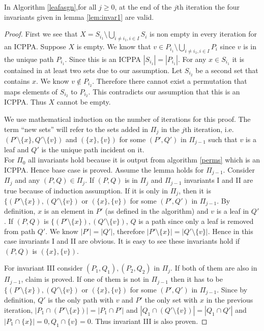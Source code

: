 \documentclass[MS]             %
              {iitmdiss_as}    %
\begin{document}
\begin{lemma}
  \label{lem:invar3}
  In Algorithm \ref{leafasgn},for all $j \geq 0$, at the end of the
  $j$th iteration the four invariants given in lemma \ref{lem:invar1}
  are valid.
\end{lemma}
\begin{proof}
  First we see that $X = S_{i_1} \setminus \bigcup_{i \ne i_1, i \in
    I}S_i$ is non empty in every iteration for an ICPPA. Suppose $X$
  is empty. We know that $v \in P_{i_1} \setminus \bigcup_{i \ne i_1,
    i \in I}P_i$ since $v$ is in the unique path $P_{i_1}$. Since this
  is an ICPPA $|S_{i_1}| = |P_{i_1}|$. For any $x \in S_{i_1}$ it is
  contained in at least two sets due to our assumption. Let $S_{i_2}$
  be a second set that contains $x$. We know $v \notin
  P_{i_2}$. Therefore there cannot exist a permutation that maps
  elements of $S_{i_2}$ to $P_{i_2}$. This contradicts our assumption
  that this is an ICPPA. Thus $X$ cannot be empty.


  We use mathematical induction on the number of iterations for this
  proof. The term ``new sets'' will refer to the sets added in $\Pi_j$
  in the $j$th iteration, i.e. $(P' \setminus \{x\},Q' \setminus
  \{v\})$ and $(\{x\},\{v\})$ for some $(P',Q')$ in $\Pi_{j-1}$ such
  that $v$ is a leaf and $Q'$ is the unique path
  incident on it.\\
  For $\Pi_0$ all invariants hold because it is output from algorithm
  \ref{perms} which is an ICPPA. Hence base case is proved.  Assume
  the lemma holds for $\Pi_{j-1}$. Consider $\Pi_j$ and any $(P,Q) \in
  \Pi_j$. If $(P,Q) $ is in $ \Pi_j$ and $\Pi_{j-1}$ invariants I and
  II are true because of induction assumption. If it is only in
  $\Pi_j$, then it is $\{(P' \setminus \{x\}),(Q' \setminus \{v\})$ or
  $(\{x\},\{v\})$ for some $(P',Q')$ in $\Pi_{j-1}$. By definition,
  $x$ is an element in $P'$ (as defined in the algorithm) and $v$ is a
  leaf in $Q'$. If $(P,Q)$ is $\{(P' \setminus \{x\}),(Q' \setminus
  \{v\})$, $Q$ is a path since only a leaf is removed from path
  $Q'$. We know $|P'| = |Q'|$, therefore $|P' \setminus \{x\}| = |Q'
  \setminus \{v\}|$. Hence in this case invariants I and II are
  obvious. It is easy to see these invariants hold if $(P,Q)$ is
  $(\{x\},\{v\})$.


  For invariant III consider $(P_1,Q_1),(P_2,Q_2)$ in $\Pi_j$. If both
  of them are also in $\Pi_{j-1}$, claim is proved. If one of them is
  not in $\Pi_{j-1}$ then it has to be $\{(P' \setminus \{x\}),(Q'
  \setminus \{v\})$ or $(\{x\},\{v\})$ for some $(P',Q')$ in
  $\Pi_{j-1}$. Since by definition, $Q'$ is the only path with $v$ and
  $P'$ the only set with $x$ in the previous iteration, $|P_1 \cap (P'
  \setminus \{x\})| = |P_1 \cap P'|$ and $|Q_1 \cap (Q' \setminus
  \{v\})| = |Q_1 \cap Q'|$ and $|P_1 \cap \{x\}| = 0, Q_1 \cap \{v\} =
  0$. Thus invariant III is also proven.


\end{proof}
\end{document}
